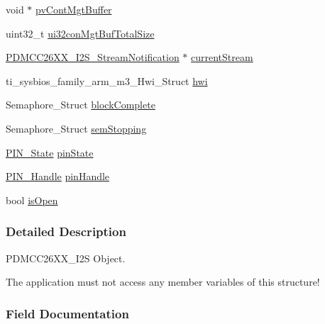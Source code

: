 \begin{DoxyCompactItemize}
void $\ast$ \hyperlink{struct_p_d_m_c_c26_x_x___i2_s___object_a1767920f3e01a87104784c5bc9adebeb}{pv\+Cont\+Mgt\+Buffer}
\item 
uint32\+\_\+t \hyperlink{struct_p_d_m_c_c26_x_x___i2_s___object_a20491798f24484564defb6418233de28}{ui32con\+Mgt\+Buf\+Total\+Size}
\item 
\hyperlink{struct_p_d_m_c_c26_x_x___i2_s___stream_notification}{P\+D\+M\+C\+C26\+X\+X\+\_\+\+I2\+S\+\_\+\+Stream\+Notification} $\ast$ \hyperlink{struct_p_d_m_c_c26_x_x___i2_s___object_a53ae4a933eca22f77f05ddaeb9da6a4d}{current\+Stream}
\item 
ti\+\_\+sysbios\+\_\+family\+\_\+arm\+\_\+m3\+\_\+\+Hwi\+\_\+\+Struct \hyperlink{struct_p_d_m_c_c26_x_x___i2_s___object_a66297ce4fec0f8c26e752cf8d1c1aaf2}{hwi}
\item 
Semaphore\+\_\+\+Struct \hyperlink{struct_p_d_m_c_c26_x_x___i2_s___object_a3619d6776e9d8d9f5856c5fe6713dd95}{block\+Complete}
\item 
Semaphore\+\_\+\+Struct \hyperlink{struct_p_d_m_c_c26_x_x___i2_s___object_a69503841d91a6659e1566bd0617d804c}{sem\+Stopping}
\item 
\hyperlink{_p_i_n_8h_a36ef69d50df6baa6973482669c24a522}{P\+I\+N\+\_\+\+State} \hyperlink{struct_p_d_m_c_c26_x_x___i2_s___object_a369c473d24f32e961a4b9d5fe01620fb}{pin\+State}
\item 
\hyperlink{_p_i_n_8h_afb2de52b054638f63c39df1f30a0d88d}{P\+I\+N\+\_\+\+Handle} \hyperlink{struct_p_d_m_c_c26_x_x___i2_s___object_a98840eae8f2530e3c263ab66f31c2d8e}{pin\+Handle}
\item 
bool \hyperlink{struct_p_d_m_c_c26_x_x___i2_s___object_abea7f7d13e225bd7f9a036b78a5cd13c}{is\+Open}
\end{DoxyCompactItemize}


\subsubsection{Detailed Description}
P\+D\+M\+C\+C26\+X\+X\+\_\+\+I2\+S Object. 

The application must not access any member variables of this structure! 

\subsubsection{Field Documentation}
